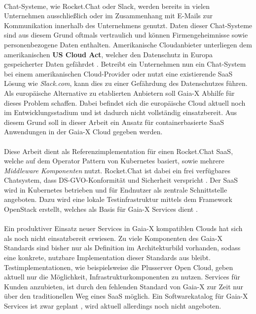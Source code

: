 \paragraph{}
Chat-Systeme, wie Rocket.Chat oder Slack, werden bereits in vielen Unternehmen ausschließlich oder im Zusammenhang mit E-Mails
zur Kommunikation innerhalb des Unternehmens genutzt. Daten dieser Chat-Systeme sind aus diesem Grund oftmals vertraulich
und können Firmengeheimnisse sowie personenbezogene Daten enthalten. 
Amerikanische Cloudanbieter unterliegen dem amerikanischen \textbf{US Cloud Act}, welcher
den Datenschutz in Europa gespeicherter Daten gefährdet \cite{Kagermann2021}.
Betreibt ein Unternehmen nun ein Chat-System bei einem amerikanischen Cloud-Provider oder nutzt eine existierende
\ac{SaaS} Lösung wie \emph{Slack.com}, kann dies zu einer Gefährdung des Datenschutzes führen.
Als europäische Alternative zu etablierten Anbietern soll Gaia-X Abhilfe für dieses Problem schaffen.
Dabei befindet sich die europäische Cloud aktuell noch im Entwicklungsstadium und ist dadurch nicht vollständig einsatzbereit.
Aus diesem Grund soll in dieser Arbeit ein Ansatz für containerbasierte \ac{SaaS} Anwendungen in der Gaia-X Cloud gegeben werden.

\paragraph{}
Diese Arbeit dient als Referenzimplementation für einen 
Rocket.Chat \ac{SaaS}, welche auf dem Operator Pattern von Kubernetes basiert, sowie mehrere \emph{Middleware Komponenten} nutzt.
Rocket.Chat ist dabei ein frei verfügbares Chatsystem, dass DS-GVO-Konformität und Sicherheit verspricht \cite{RocketChat}.
Der \ac{SaaS} wird in Kubernetes betrieben und für Endnutzer als zentrale Schnittstelle angeboten.
Dazu wird eine lokale Testinfrastruktur mittels dem Framework OpenStack erstellt,
welches als Basis für Gaia-X Services dient \cite{scs}.

\paragraph{}
Ein produktiver Einsatz neuer Services in Gaia-X kompatiblen Clouds hat sich als noch nicht einsatzbereit erwiesen.
Zu viele Komponenten des Gaia-X Standards sind bisher nur als Definition im Architekturbild vorhanden, sodass eine konkrete,
nutzbare Implementation dieser Standards aus bleibt. 
Testimplementationen, wie beispielsweise die Plusserver Open Cloud, geben aktuell nur die Möglichkeit,
Infrastrukturkomponenten zu nutzen.
Services für Kunden anzubieten, ist durch den fehlenden Standard von Gaia-X zur Zeit nur über den traditionellen Weg eines
\ac{SaaS} möglich.
Ein Softwarekatalog für Gaia-X Services ist zwar geplant \cite{BMWi2019},
wird aktuell allerdings noch nicht angeboten.

